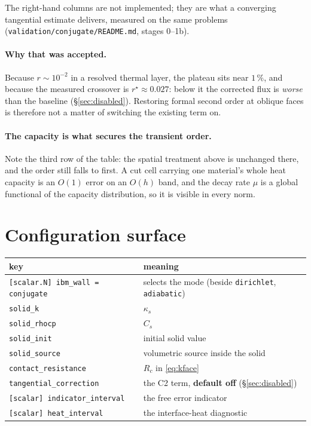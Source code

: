 \documentclass[11pt,a4paper]{article}
\newcommand{\code}[1]{\texttt{#1}}
\begin{document}
The right-hand columns are not implemented; they are what a converging
tangential estimate delivers, measured on the same problems
(\texttt{validation/conjugate/README.md}, stages 0--1b).

\paragraph{Why that was accepted.}
Because $r\sim10^{-2}$ in a resolved thermal layer, the plateau sits near
$1\,\%$, and because the measured crossover is $r^\star\approx0.027$: below
it the corrected flux is \emph{worse} than the baseline
(\S\ref{sec:disabled}). Restoring formal second order at oblique faces is
therefore not a matter of switching the existing term on.

\paragraph{The capacity is what secures the transient order.}
Note the third row of the table: the spatial treatment above is unchanged
there, and the order still falls to first. A cut cell carrying one material's
whole heat capacity is an $O(1)$ error on an $O(h)$ band, and the decay rate
$\mu$ is a global functional of the capacity distribution, so it is visible in
every norm.

\section{Configuration surface}

\begin{center}
\begin{tabular}{ll}
\toprule
key & meaning \\
\midrule
\code{[scalar.N] ibm\_wall = conjugate} & selects the mode (beside
   \code{dirichlet}, \code{adiabatic}) \\
\code{solid\_k}        & $\kappa_s$ \\
\code{solid\_rhocp}    & $C_s$ \\
\code{solid\_init}     & initial solid value \\
\code{solid\_source}   & volumetric source inside the solid \\
\code{contact\_resistance} & $R_c$ in \eqref{eq:kface} \\
\code{tangential\_correction} & the C2 term, \textbf{default off}
   (\S\ref{sec:disabled}) \\
\code{[scalar] indicator\_interval} & the free error indicator \\
\code{[scalar] heat\_interval}      & the interface-heat diagnostic \\
\bottomrule
\end{tabular}
\end{center}
\end{document}
